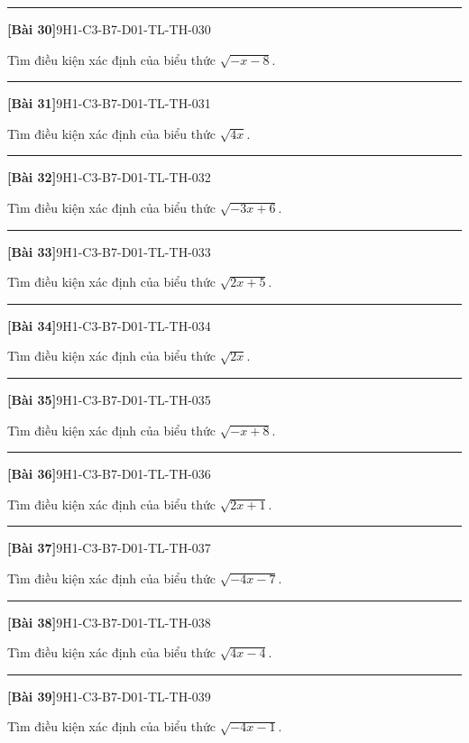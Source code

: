 \documentclass[12pt,a4paper]{article}
\newif\ifloigiai
\newenvironment{cauhoi}[2]{%
  \par\medskip\noindent\rule{\textwidth}{0.4pt}\par\nopagebreak
  \noindent\textbf{[#1]}\hfill{\scriptsize\ttfamily #2}\par\nopagebreak\smallskip}{\par}
\newcommand{\loigiai}[1]{\ifloigiai\par\smallskip\noindent\textit{Lời giải.} #1\par\fi}
\begin{document}
\begin{cauhoi}{Bài 30}{9H1-C3-B7-D01-TL-TH-030}
Tìm điều kiện xác định của biểu thức $\sqrt{-x - 8}$.
\loigiai{Biểu thức xác định khi $-x - 8\ge 0$, tức là $x\le -8$, suy ra $x\le -8$.}
\end{cauhoi}
\begin{cauhoi}{Bài 31}{9H1-C3-B7-D01-TL-TH-031}
Tìm điều kiện xác định của biểu thức $\sqrt{4x}$.
\loigiai{Biểu thức xác định khi $4x\ge 0$, tức là $x\ge 0$.}
\end{cauhoi}
\begin{cauhoi}{Bài 32}{9H1-C3-B7-D01-TL-TH-032}
Tìm điều kiện xác định của biểu thức $\sqrt{-3x + 6}$.
\loigiai{Biểu thức xác định khi $-3x + 6\ge 0$, tức là $3x\le 6$, suy ra $x\le 2$.}
\end{cauhoi}
\begin{cauhoi}{Bài 33}{9H1-C3-B7-D01-TL-TH-033}
Tìm điều kiện xác định của biểu thức $\sqrt{2x + 5}$.
\loigiai{Biểu thức xác định khi $2x + 5\ge 0$, tức là $x\ge -\dfrac{5}{2}$.}
\end{cauhoi}
\begin{cauhoi}{Bài 34}{9H1-C3-B7-D01-TL-TH-034}
Tìm điều kiện xác định của biểu thức $\sqrt{2x}$.
\loigiai{Biểu thức xác định khi $2x\ge 0$, tức là $x\ge 0$.}
\end{cauhoi}
\begin{cauhoi}{Bài 35}{9H1-C3-B7-D01-TL-TH-035}
Tìm điều kiện xác định của biểu thức $\sqrt{-x + 8}$.
\loigiai{Biểu thức xác định khi $-x + 8\ge 0$, tức là $x\le 8$, suy ra $x\le 8$.}
\end{cauhoi}
\begin{cauhoi}{Bài 36}{9H1-C3-B7-D01-TL-TH-036}
Tìm điều kiện xác định của biểu thức $\sqrt{2x + 1}$.
\loigiai{Biểu thức xác định khi $2x + 1\ge 0$, tức là $x\ge -\dfrac{1}{2}$.}
\end{cauhoi}
\begin{cauhoi}{Bài 37}{9H1-C3-B7-D01-TL-TH-037}
Tìm điều kiện xác định của biểu thức $\sqrt{-4x - 7}$.
\loigiai{Biểu thức xác định khi $-4x - 7\ge 0$, tức là $4x\le -7$, suy ra $x\le -\dfrac{7}{4}$.}
\end{cauhoi}
\begin{cauhoi}{Bài 38}{9H1-C3-B7-D01-TL-TH-038}
Tìm điều kiện xác định của biểu thức $\sqrt{4x - 4}$.
\loigiai{Biểu thức xác định khi $4x - 4\ge 0$, tức là $x\ge 1$.}
\end{cauhoi}
\begin{cauhoi}{Bài 39}{9H1-C3-B7-D01-TL-TH-039}
Tìm điều kiện xác định của biểu thức $\sqrt{-4x - 1}$.
\loigiai{Biểu thức xác định khi $-4x - 1\ge 0$, tức là $4x\le -1$, suy ra $x\le -\dfrac{1}{4}$.}
\end{cauhoi}
\end{document}
